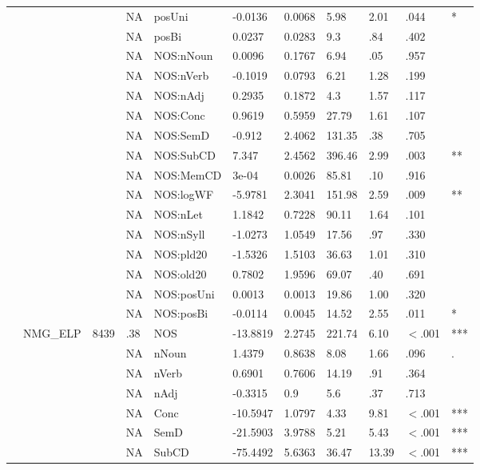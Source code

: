 \begin{table}[ht]
\begin{tabular}{lllllllllll}
   &  &  & NA & posUni & -0.0136 & 0.0068 & 5.98 & 2.01 & .044 & * \\ 
   &  &  & NA & posBi & 0.0237 & 0.0283 & 9.3 & .84 & .402 &   \\ 
   &  &  & NA & NOS:nNoun & 0.0096 & 0.1767 & 6.94 & .05 & .957 &   \\ 
   &  &  & NA & NOS:nVerb & -0.1019 & 0.0793 & 6.21 & 1.28 & .199 &   \\ 
   &  &  & NA & NOS:nAdj & 0.2935 & 0.1872 & 4.3 & 1.57 & .117 &   \\ 
   &  &  & NA & NOS:Conc & 0.9619 & 0.5959 & 27.79 & 1.61 & .107 &   \\ 
   &  &  & NA & NOS:SemD & -0.912 & 2.4062 & 131.35 & .38 & .705 &   \\ 
   &  &  & NA & NOS:SubCD & 7.347 & 2.4562 & 396.46 & 2.99 & .003 & ** \\ 
   &  &  & NA & NOS:MemCD & 3e-04 & 0.0026 & 85.81 & .10 & .916 &   \\ 
   &  &  & NA & NOS:logWF & -5.9781 & 2.3041 & 151.98 & 2.59 & .009 & ** \\ 
   &  &  & NA & NOS:nLet & 1.1842 & 0.7228 & 90.11 & 1.64 & .101 &   \\ 
   &  &  & NA & NOS:nSyll & -1.0273 & 1.0549 & 17.56 & .97 & .330 &   \\ 
   &  &  & NA & NOS:pld20 & -1.5326 & 1.5103 & 36.63 & 1.01 & .310 &   \\ 
   &  &  & NA & NOS:old20 & 0.7802 & 1.9596 & 69.07 & .40 & .691 &   \\ 
   &  &  & NA & NOS:posUni & 0.0013 & 0.0013 & 19.86 & 1.00 & .320 &   \\ 
   &  &  & NA & NOS:posBi & -0.0114 & 0.0045 & 14.52 & 2.55 & .011 & * \\ 
   & NMG\_ELP & 8439 & .38 & NOS & -13.8819 & 2.2745 & 221.74 & 6.10 & $<$.001 & *** \\ 
   &  &  & NA & nNoun & 1.4379 & 0.8638 & 8.08 & 1.66 & .096 & . \\ 
   &  &  & NA & nVerb & 0.6901 & 0.7606 & 14.19 & .91 & .364 &   \\ 
   &  &  & NA & nAdj & -0.3315 & 0.9 & 5.6 & .37 & .713 &   \\ 
   &  &  & NA & Conc & -10.5947 & 1.0797 & 4.33 & 9.81 & $<$.001 & *** \\ 
   &  &  & NA & SemD & -21.5903 & 3.9788 & 5.21 & 5.43 & $<$.001 & *** \\ 
   &  &  & NA & SubCD & -75.4492 & 5.6363 & 36.47 & 13.39 & $<$.001 & *** \\ 

\end{tabular}
\end{table}
